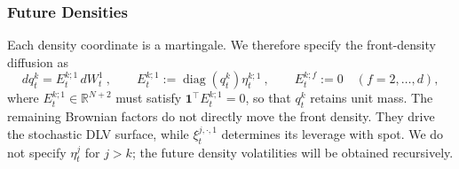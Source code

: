 \documentclass[11pt]{article}
\newcommand{\one}{\mathbf 1}
\theoremstyle{plain}
\theoremstyle{definition}
\theoremstyle{remark}
\begin{document}
{      \subsubsection{Future Densities}
  \label{sec:future-densities}

       Each density coordinate
      is a martingale. We therefore specify the front-density diffusion as
      \[
        dq_t^k=E_t^{k;1}\,dW_t^1 \ ,
        \qquad
        E_t^{k;1}:=\operatorname{diag}(q_t^k)\eta_t^{k;1} \ ,
        \qquad E_t^{k;f}:=0\quad(f=2,\ldots,d),
      \]
      where $E_t^{k;1}\in\mathbb R^{N+2}$ must satisfy
      $\one^{\!\top}E_t^{k;1}=0$, so that $q_t^k$ retains unit mass. The
      remaining Brownian factors do not directly move the front density. They
      drive the stochastic DLV surface, while $\xi_t^{j,\cdot,1}$ determines
      its leverage with spot. We do not specify $\eta_t^j$ for $j>k$; the
      future density volatilities will be obtained recursively.

}
\end{document}
